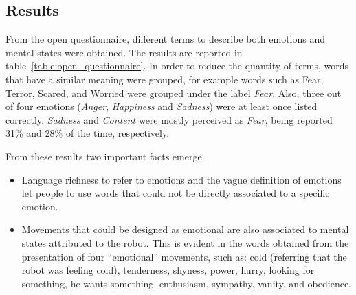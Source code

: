 \subsection{Results}

From the open questionnaire, different terms to describe both emotions and mental states were obtained. The results are reported in table~\ref{table:open_questionnaire}. In order to reduce the quantity of terms, words that have a similar meaning were grouped, for example words such as Fear, Terror, Scared, and Worried were grouped under the label \textit{Fear}. Also, three out of four emotions (\textit{Anger}, \textit{Happiness} and \textit{Sadness}) were at least once listed correctly. \textit{Sadness} and \textit{Content} were mostly perceived as \textit{Fear}, being reported 31\% and 28\% of the time, respectively.

From these results two important facts emerge.

\begin{itemize}
	
	\item Language richness to refer to emotions and the vague definition of emotions let people to use words that could not be directly associated to a specific emotion. 
	
	\item Movements that could be designed as emotional are also associated to mental states attributed to the robot. This is evident in the words obtained from the presentation of four ``emotional'' movements, such as: cold (referring that the robot was feeling cold), tenderness, shyness, power, hurry, looking for something, he wants something, enthusiasm, sympathy, vanity, and obedience. 
	
\end{itemize}

